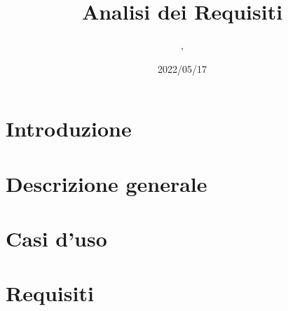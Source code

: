 \documentclass{classes/base}
\title{Analisi dei Requisiti}
\date{2022/05/17}
\author{\angela{},\\ \giulio{}}
\begin{document}
	\maketitle
	\newpage
	
	\newpage
	\tableofcontents
	\newpage
	\listoftables
	\newpage
	\listoffigures
  
	\newpage
	\section{Introduzione}
	

	\newpage
	\section{Descrizione generale}
	

	\newpage
	\section{Casi d'uso}
	

	\newpage
	\section{Requisiti}
	
\end{document}
